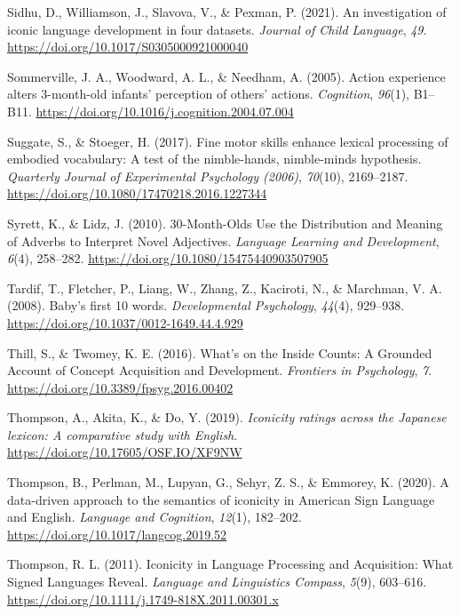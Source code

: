 \documentclass[
  man,floatsintext]{apa6}
\newlength{\cslhangindent}
\newenvironment{CSLReferences}[2] %
 {\begin{list}{}{%
  \setlength{\itemindent}{0pt}
  \setlength{\leftmargin}{0pt}
  \setlength{\parsep}{0pt}
  \ifodd #1
   \setlength{\leftmargin}{\cslhangindent}
   \setlength{\itemindent}{-1\cslhangindent}
  \fi
  \setlength{\itemsep}{#2\baselineskip}}}
 {\end{list}}
\begin{document}
\begin{CSLReferences}{1}{0}
Sidhu, D., Williamson, J., Slavova, V., \& Pexman, P. (2021). An investigation of iconic language development in four datasets. \emph{Journal of Child Language}, \emph{49}. \url{https://doi.org/10.1017/S0305000921000040}

Sommerville, J. A., Woodward, A. L., \& Needham, A. (2005). Action experience alters 3-month-old infants' perception of others' actions. \emph{Cognition}, \emph{96}(1), B1--B11. \url{https://doi.org/10.1016/j.cognition.2004.07.004}

Suggate, S., \& Stoeger, H. (2017). Fine motor skills enhance lexical processing of embodied vocabulary: {A} test of the nimble-hands, nimble-minds hypothesis. \emph{Quarterly Journal of Experimental Psychology (2006)}, \emph{70}(10), 2169--2187. \url{https://doi.org/10.1080/17470218.2016.1227344}

Syrett, K., \& Lidz, J. (2010). 30-{Month-Olds Use} the {Distribution} and {Meaning} of {Adverbs} to {Interpret Novel Adjectives}. \emph{Language Learning and Development}, \emph{6}(4), 258--282. \url{https://doi.org/10.1080/15475440903507905}

Tardif, T., Fletcher, P., Liang, W., Zhang, Z., Kaciroti, N., \& Marchman, V. A. (2008). Baby's first 10 words. \emph{Developmental Psychology}, \emph{44}(4), 929--938. \url{https://doi.org/10.1037/0012-1649.44.4.929}

Thill, S., \& Twomey, K. E. (2016). What's on the {Inside Counts}: {A Grounded Account} of {Concept Acquisition} and {Development}. \emph{Frontiers in Psychology}, \emph{7}. \url{https://doi.org/10.3389/fpsyg.2016.00402}

Thompson, A., Akita, K., \& Do, Y. (2019). \emph{Iconicity ratings across the {Japanese} lexicon: {A} comparative study with {English}}. \url{https://doi.org/10.17605/OSF.IO/XF9NW}

Thompson, B., Perlman, M., Lupyan, G., Sehyr, Z. S., \& Emmorey, K. (2020). A data-driven approach to the semantics of iconicity in {American Sign Language} and {English}. \emph{Language and Cognition}, \emph{12}(1), 182--202. \url{https://doi.org/10.1017/langcog.2019.52}

Thompson, R. L. (2011). Iconicity in {Language Processing} and {Acquisition}: {What Signed Languages Reveal}. \emph{Language and Linguistics Compass}, \emph{5}(9), 603--616. \url{https://doi.org/10.1111/j.1749-818X.2011.00301.x}


\end{CSLReferences}
\end{document}

